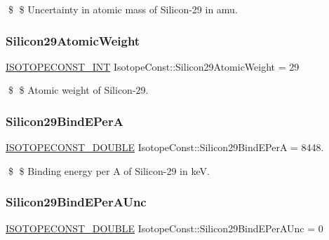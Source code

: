 \$ \$ Uncertainty in atomic mass of Silicon-\/29 in amu. \mbox{\label{group___isotope_const-_silicon-_si29_ga05ddd69682d91a3ed44b913597b9f6b3}} 
\subsubsection{\texorpdfstring{Silicon29\+Atomic\+Weight}{Silicon29AtomicWeight}}
{\footnotesize\ttfamily \mbox{\hyperlink{group___isotope_const-_macros_ga5f18360b3e99483a35c32d789e62621c}{I\+S\+O\+T\+O\+P\+E\+C\+O\+N\+S\+T\+\_\+\+I\+NT}} Isotope\+Const\+::\+Silicon29\+Atomic\+Weight = 29}

\$ \$ Atomic weight of Silicon-\/29. \mbox{\label{group___isotope_const-_silicon-_si29_gaab1df50e8c17e7055b2373fb2207a29e}} 
\subsubsection{\texorpdfstring{Silicon29\+Bind\+E\+PerA}{Silicon29BindEPerA}}
{\footnotesize\ttfamily \mbox{\hyperlink{group___isotope_const-_macros_ga8f45a7272ce02c0b4c65c44636ed719a}{I\+S\+O\+T\+O\+P\+E\+C\+O\+N\+S\+T\+\_\+\+D\+O\+U\+B\+LE}} Isotope\+Const\+::\+Silicon29\+Bind\+E\+PerA = 8448.}

\$ \$ Binding energy per A of Silicon-\/29 in keV. \mbox{\label{group___isotope_const-_silicon-_si29_gac7b18bde96f70fbb1284d7fdc0f03352}} 
\subsubsection{\texorpdfstring{Silicon29\+Bind\+E\+Per\+A\+Unc}{Silicon29BindEPerAUnc}}
{\footnotesize\ttfamily \mbox{\hyperlink{group___isotope_const-_macros_ga8f45a7272ce02c0b4c65c44636ed719a}{I\+S\+O\+T\+O\+P\+E\+C\+O\+N\+S\+T\+\_\+\+D\+O\+U\+B\+LE}} Isotope\+Const\+::\+Silicon29\+Bind\+E\+Per\+A\+Unc = 0}

